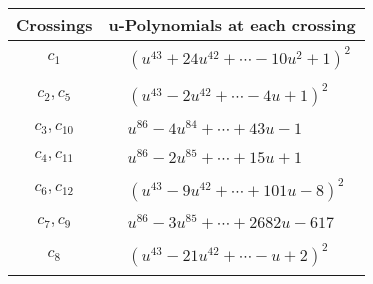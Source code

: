 \documentclass[1p]{elsarticle_modified}
\theoremstyle{definition}
\begin{document}
\begin{tabular}{m{50pt}|m{274pt}}
Crossings & \hspace{64pt}u-Polynomials at each crossing \\
\hline $$\begin{aligned}c_{1}\end{aligned}$$&$\begin{aligned}
&(u^{43}+24 u^{42}+\cdots-10 u^2+1)^{2}
\end{aligned}$\\
\hline $$\begin{aligned}c_{2},c_{5}\end{aligned}$$&$\begin{aligned}
&(u^{43}-2 u^{42}+\cdots-4 u+1)^{2}
\end{aligned}$\\
\hline $$\begin{aligned}c_{3},c_{10}\end{aligned}$$&$\begin{aligned}
&u^{86}-4 u^{84}+\cdots+43 u-1
\end{aligned}$\\
\hline $$\begin{aligned}c_{4},c_{11}\end{aligned}$$&$\begin{aligned}
&u^{86}-2 u^{85}+\cdots+15 u+1
\end{aligned}$\\
\hline $$\begin{aligned}c_{6},c_{12}\end{aligned}$$&$\begin{aligned}
&(u^{43}-9 u^{42}+\cdots+101 u-8)^{2}
\end{aligned}$\\
\hline $$\begin{aligned}c_{7},c_{9}\end{aligned}$$&$\begin{aligned}
&u^{86}-3 u^{85}+\cdots+2682 u-617
\end{aligned}$\\
\hline $$\begin{aligned}c_{8}\end{aligned}$$&$\begin{aligned}
&(u^{43}-21 u^{42}+\cdots- u+2)^{2}
\end{aligned}$\\
\hline
\end{tabular}\\~\\
\newpage\renewcommand{\arraystretch}{1}
\end{document}
